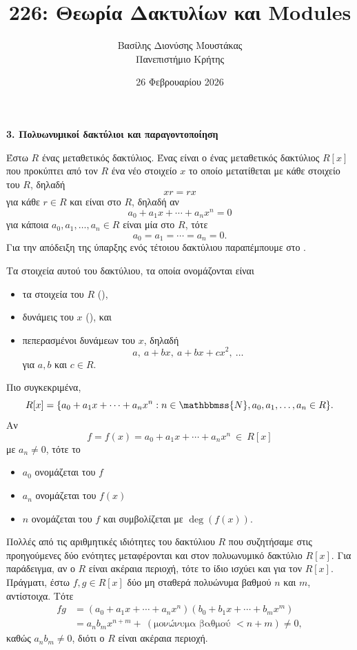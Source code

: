 \documentclass[12pt,a4paper,reqno]{amsart}
\title{226: Θεωρία Δακτυλίων και Modules}
\author[Β.~Δ. Μουστακας]{Βασίλης Διονύσης Μουστάκας \\ Πανεπιστήμιο Κρήτης}
\date{26 Φεβρουαρίου 2026}
\theoremstyle{definition}
\theoremstyle{remark}
\numberwithin{theorem}{section}
\numberwithin{exercise}{section}
\numberwithin{equation}{section}
\newcommand{\NN}{\mathbbmss{N}}
\newcommand{\defn}[1]{{\color{mylightblue}{#1}}}
\begin{document}
\begingroup
\def\uppercasenonmath#1{} %
\let\MakeUppercase\relax %
\maketitle
\endgroup

\setcounter{section}{3}
\begin{center}
    \textbf{3. Πολυωνυμικοί δακτύλιοι και παραγοντοποίηση
} 
\end{center}

Έστω $R$ ένας μεταθετικός δακτύλιος. Ένας \defn{πολυωνυμικός δακτύλιος σε μία μεταβλητή} είναι ο ένας μεταθετικός δακτύλιος $R[x]$ που προκύπτει από τον $R$  ένα νέο στοιχείο $x$ το οποίο μετατίθεται με κάθε στοιχείο του $R$, δηλαδή
\[
xr = rx
\]
για κάθε $r \in R$ και είναι  στο $R$, δηλαδή αν 
\[
a_0 + a_1x + \cdots + a_nx^n = 0
\]
για κάποια $a_0, a_1, \dots, a_n \in R$ είναι μία  στο $R$, τότε 
\[
a_0 = a_1 = \cdots = a_n = 0.
\]
Για την απόδειξη της ύπαρξης ενός τέτοιου δακτύλιου παραπέμπουμε στο \cite[Θεώρημα~2.2.1]{VDEMT13}.

Τα στοιχεία αυτού του δακτύλιου, τα οποία ονομάζονται \defn{πολυώνυμα} είναι 
\begin{itemize}
    \item τα στοιχεία του $R$ (\defn{σταθερά πολυώνυμα}),
    \item δυνάμεις του $x$ (\defn{μονώνυμα}), και
    \item πεπερασμένοι  δυνάμεων του $x$, δηλαδή 
    \[
    a, \ a + bx, \ a + bx + cx^2, \ \dots 
    \]
    για $a, b$ και $c \in R$.
\end{itemize}
Πιο συγκεκριμένα, 
\[
R[x] = \{ a_0 + a_1x + \cdots + a_nx^n : n \in \NN, a_0, a_1, \dots, a_n \in R\}.
\]
Αν 
\[
f = f(x) = a_0 + a_1x + \cdots + a_nx^n \ \in \ R[x]
\]
με $a_n \neq 0$, τότε το 
\begin{itemize}
    \item $a_0$ ονομάζεται \defn{σταθερός όρος} του $f$
    \item $a_n$ ονομάζεται \defn{μεγιστοβάθμιος συντελεστής} του $f(x)$
    \item $n$ ονομάζεται \defn{βαθμός} του $f$ και συμβολίζεται με $\deg(f(x))$.
\end{itemize}

Πολλές από τις αριθμητικές ιδιότητες του δακτύλιου $R$ που συζητήσαμε στις προηγούμε\-νες δύο ενότητες μεταφέρονται και στον πολυωνυμικό δακτύλιο $R[x]$. Για παράδειγμα, αν ο $R$ είναι ακέραια περιοχή, τότε το ίδιο ισχύει και για τον $R[x]$. Πράγματι, έστω $f, g \in R[x]$ δύο μη σταθερά πολυώνυμα βαθμού $n$ και $m$, αντίστοιχα. Τότε 
\begin{align*}
    fg 
    &= (a_0 + a_1x + \cdots + a_nx^n)(b_0 + b_1x + \cdots + b_mx^m) \\ 
    &= a_nb_m x^{n+m} + \ \left(\text{μονώνυμα βαθμού $< n + m$}\right) \neq 0, 
\end{align*}
καθώς $a_nb_m \neq 0$, διότι ο $R$ είναι ακέραια περιοχή. 
\end{document}
